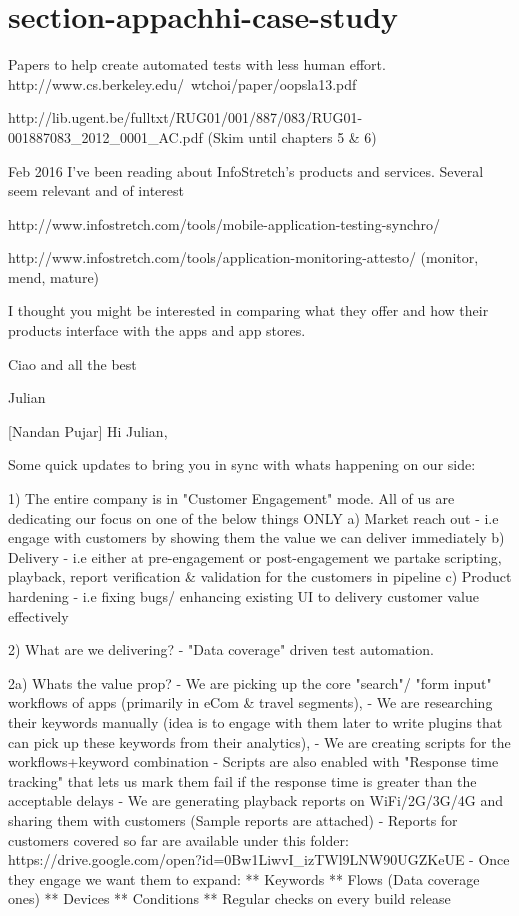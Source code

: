 \section{section-appachhi-case-study}

Papers to help create automated tests with less human effort.
http://www.cs.berkeley.edu/~wtchoi/paper/oopsla13.pdf 

http://lib.ugent.be/fulltxt/RUG01/001/887/083/RUG01-001887083_2012_0001_AC.pdf (Skim until chapters 5 & 6)

Feb 2016
I've been reading about InfoStretch's products and services. Several seem relevant and of interest

http://www.infostretch.com/tools/mobile-application-testing-synchro/

http://www.infostretch.com/tools/application-monitoring-attesto/ (monitor, mend, mature)

I thought you might be interested in comparing what they offer and how their products interface with the apps and app stores.

Ciao and all the best


Julian

[Nandan Pujar] Hi Julian,

Some quick updates to bring you in sync with whats happening on our side:

1) The entire company is in "Customer Engagement" mode. All of us are dedicating our focus on one of the below things ONLY
a) Market reach out - i.e engage with customers by showing them the value we can deliver immediately
b) Delivery - i.e either at pre-engagement or post-engagement we partake scripting, playback, report verification & validation for the customers in pipeline
c) Product hardening - i.e fixing bugs/ enhancing existing UI to delivery customer value effectively

2) What are we delivering? - 
"Data coverage" driven test automation. 

2a) Whats the value prop?
- We are picking up the core "search"/ "form input" workflows of apps (primarily in eCom & travel segments), 
- We are researching their keywords manually (idea is to engage with them later to write plugins that can pick up these keywords from their analytics), 
- We are creating scripts for the workflows+keyword combination
- Scripts are also enabled with "Response time tracking" that lets us mark them fail if the response time is greater than the acceptable delays
- We are generating playback reports on WiFi/2G/3G/4G and sharing them with customers (Sample reports are attached)
- Reports for customers covered so far are available under this folder:
https://drive.google.com/open?id=0Bw1LiwvI_izTWl9LNW90UGZKeUE
- Once they engage we want them to expand:
** Keywords
** Flows (Data coverage ones)
** Devices
** Conditions
** Regular checks on every build release

